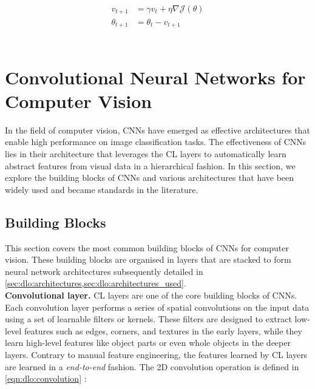 \begin{equation}
  \label{eqn:dlo:sgd_momentum_update}
  \begin{split}
    v_{t+1} &= \gamma v_t + \eta \nabla \mathcal{J}(\theta) \\
    \theta_{t+1} &= \theta_t - v_{t+1}
  \end{split}
\end{equation}\\

\section{Convolutional Neural Networks for Computer Vision}\label{sec:dlo:cnn}

In the field of computer vision, \acp{CNN} have emerged as effective
architectures that enable high performance on image classification tasks. The
effectiveness of \acp{CNN} lies in their architecture that leverages the \ac{CL}
layers to automatically learn abstract features from visual data in a
hierarchical fashion. In this section, we explore the building blocks of
\acp{CNN} and various architectures that have been widely used and became
standards in the literature.

\subsection{Building Blocks}

This section covers the most common building blocks of \acp{CNN} for computer
vision. These building blocks are organised in layers that are stacked to form
neural network architectures subsequently detailed in
\cref{sec:dlo:architectures,sec:dlo:architectures_used}.\\

\noindent\textbf{Convolutional layer.} \ac{CL} layers are one of the core
building blocks of \acp{CNN}. Each convolution layer performs a series of
spatial convolutions on the input data using a set of learnable filters or
kernels. These filters are designed to extract low-level features such as edges,
corners, and textures in the early layers, while they learn high-level features
like object parts or even whole objects in the deeper layers. Contrary to manual
feature engineering, the features learned by \ac{CL} layers are learned in a
\emph{end-to-end} fashion. The 2D convolution operation is defined in
\cref{eqn:dlo:convolution} :\\

